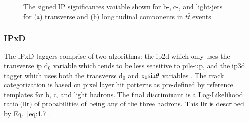 \begin{figure}[H]
    \centering
    \qquad
    \caption{ The signed IP significances variable shown for b-, c-, and light-jets for (a) transverse and (b) longitudinal components in $t\bar{t}$ events }
\label{fig:ip-sig}
\end{figure}

\subsubsection{IPxD}

The IPxD taggers comprise of two algorithms: the \gls{ip2d} which only uses the transverse \gls{ip} $\textrm{d}_{\textrm{0}}$ variable which tends to be less sensitive to pile-up, and 
the \gls{ip3d} tagger which uses both the transverse $\textrm{d}_{\textrm{0}}$ and $\textrm{\textit{z}}_{\textrm{0}} \textrm{sin}{\theta}$ variables \cite{btag-opt-2016}. The track categorization is based on 
pixel layer hit patterns as pre-defined by reference templates for b, c, and light hadrons. The final discriminant is a Log-Likelihood ratio (\gls{llr}) of probabilities of 
being any of the three hadrons. This \gls{llr} is described by Eq.~\ref{eq:4.7}.

